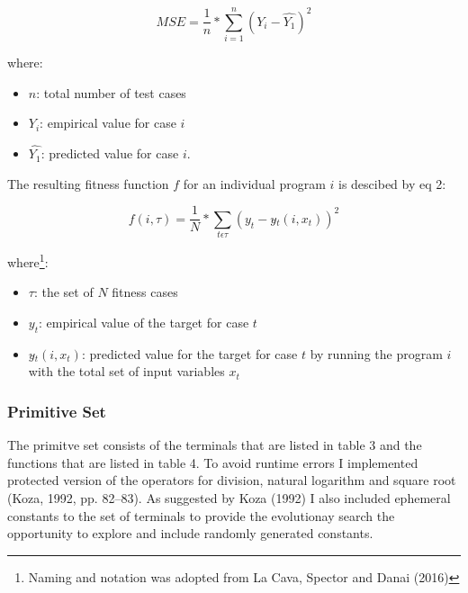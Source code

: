 \documentclass[
  12pt,
]{article}
\providecommand{\tightlist}{%
  \setlength{\itemsep}{0pt}\setlength{\parskip}{0pt}}
\begin{document}
\begin{equation}
\tag{eq. 1}
MSE = \frac{1}{n} * \sum_{i=1}^{n} (Y_i - \hat{Y_1})^2
\end{equation}

where:

\begin{itemize}
\tightlist
\item
  \(n\): total number of test cases
\item
  \(Y_i\): empirical value for case \(i\)
\item
  \(\hat{Y_1}\): predicted value for case \(i\).
\end{itemize}

The resulting fitness function \(f\) for an individual program \(i\) is
descibed by eq 2:

\begin{equation}
\tag{eq. 2}
 f(i, \tau ) = \frac{1}{N} * \sum_{t \epsilon \tau} (y_t - y\hat{}_t(i, x_t))^2 
\end{equation}

where\footnote{Naming and notation was adopted from La Cava, Spector and
  Danai (2016)}:

\begin{itemize}
\tightlist
\item
  \(\tau\): the set of \(N\) fitness cases
\item
  \(y_t\): empirical value of the target for case \(t\)
\item
  \(y\hat{}_t(i, x_t)\): predicted value for the target for case \(t\)
  by running the program \(i\) with the total set of input variables
  \(x_t\)
\end{itemize}

\hypertarget{primitive-set}{%
\subsubsection{Primitive Set}\label{primitive-set}}

The primitve set consists of the terminals that are listed in table 3
and the functions that are listed in table 4. To avoid runtime errors I
implemented protected version of the operators for division, natural
logarithm and square root (Koza, 1992, pp. 82--83). As suggested by Koza
(1992) I also included ephemeral constants to the set of terminals to
provide the evolutionay search the opportunity to explore and include
randomly generated constants.
\end{document}
